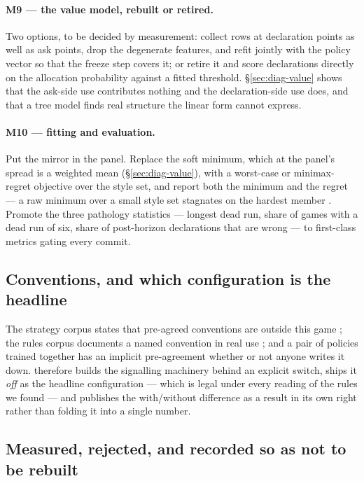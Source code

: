 \paragraph{M9 --- the value model, rebuilt or retired.} Two options, to be decided
by measurement: collect rows at declaration points as well as ask points, drop
the degenerate features, and refit jointly with the policy vector so that the
freeze step covers it; or retire it and score declarations directly on the
allocation probability against a fitted threshold. \S\ref{sec:diag-value} shows
that the ask-side use contributes nothing and the declaration-side use does, and
that a tree model finds real structure the linear form cannot express.

\paragraph{M10 --- fitting and evaluation.} Put the mirror in the panel. Replace
the soft minimum, which at the panel's spread is a weighted mean
(\S\ref{sec:diag-value}), with a worst-case or minimax-regret objective over the
style set, and report both the minimum and the regret --- a raw minimum over a
small style set stagnates on the hardest member \cite{beukman-remidi}. Promote
the three pathology statistics --- longest dead run, share of games with a dead
run of six, share of post-horizon declarations that are wrong --- to first-class
metrics gating every commit.

\subsection{Conventions, and which configuration is the headline}
\label{sec:mech-conventions}

The strategy corpus states that pre-agreed conventions are outside this game
\cite{develin}; the rules corpus documents a named convention in real use
\cite{pagat}; and a pair of policies trained together has an implicit
pre-agreement whether or not anyone writes it down. \vfive{} therefore builds the
signalling machinery behind an explicit switch, ships it \emph{off} as the
headline configuration --- which is legal under every reading of the rules we
found --- and publishes the with/without difference as a result in its own right
rather than folding it into a single number.

\subsection{Measured, rejected, and recorded so as not to be rebuilt}
\label{sec:mech-rejected}

